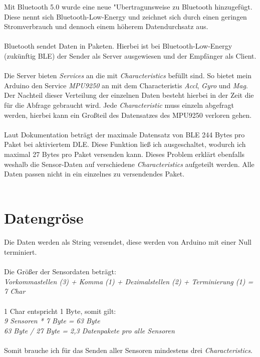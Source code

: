 Mit Bluetooth 5.0 wurde eine neue "Ubertragunsweise zu 
Bluetooth hinzugefügt. Diese nennt sich Bluetooth-Low-Energy und zeichnet
sich durch einen geringen Stromverbrauch und dennoch einem höherem 
Datendurchsatz aus. \\
\\
Bluetooth sendet Daten in Paketen. Hierbei ist bei Bluetooth-Low-Energy
(zukünftig BLE) der Sender als Server ausgewiesen und der Empfänger als Client.\\
\\
Die Server bieten \textit{Services} an die mit \textit{Characteristics} befüllt sind.
So bietet mein Arduino den Service \textit{MPU9250} an mit dem Characteristis \textit{Accl}, \textit{Gyro}
und \textit{Mag}.\\
Der Nachteil dieser Verteilung der einzelnen Daten besteht hierbei in der Zeit die für die
Abfrage gebraucht wird. Jede \textit{Characteristic} muss einzeln abgefragt werden, hierbei kann ein
Großteil des Datensatzes des MPU9250 verloren gehen.\\
\\
Laut Dokumentation beträgt der maximale Datensatz von BLE 244 Bytes pro Paket bei 
aktiviertem DLE. Diese Funktion ließ ich ausgeschaltet, wodurch ich maximal
27 Bytes pro Paket versenden kann. Dieses Problem erklärt ebenfalls weshalb die Sensor-Daten
auf verschiedene \textit{Characteristics} aufgeteilt werden. Alle Daten passen nicht in ein einzelnes
zu versendendes Paket. \\
\\

\section{Datengröse}
Die Daten werden als String versendet, diese werden von Arduino mit einer
Null terminiert. \\
\\
Die Größer der Sensordaten beträgt:\\
\textit{Vorkommastellen (3) + Komma (1) + Dezimalstellen (2) + Terminierung (1) = 7 Char}\\
\\
1 Char entspricht 1 Byte, somit gilt:\\
\textit{
9 Sensoren * 7 Byte = 63 Byte \\
63 Byte / 27 Byte = 2,3 Datenpakete pro alle Sensoren
}\\
\\
Somit brauche ich für das Senden aller Sensoren mindestens drei \textit{Characteristics}.


